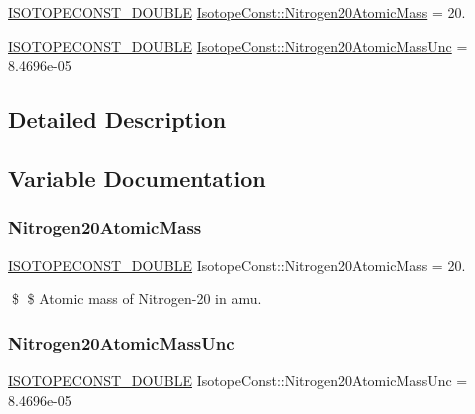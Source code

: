 \begin{DoxyCompactItemize}
\item 
\mbox{\hyperlink{group___isotope_const-_macros_ga8f45a7272ce02c0b4c65c44636ed719a}{I\+S\+O\+T\+O\+P\+E\+C\+O\+N\+S\+T\+\_\+\+D\+O\+U\+B\+LE}} \mbox{\hyperlink{group___isotope_const-_nitrogen-_n20_gadb707dbafdeed9dc6280375b0e3ff050}{Isotope\+Const\+::\+Nitrogen20\+Atomic\+Mass}} = 20.
\item 
\mbox{\hyperlink{group___isotope_const-_macros_ga8f45a7272ce02c0b4c65c44636ed719a}{I\+S\+O\+T\+O\+P\+E\+C\+O\+N\+S\+T\+\_\+\+D\+O\+U\+B\+LE}} \mbox{\hyperlink{group___isotope_const-_nitrogen-_n20_ga5f70a30733c52884808cba7f1b2c8115}{Isotope\+Const\+::\+Nitrogen20\+Atomic\+Mass\+Unc}} = 8.\+4696e-\/05
\end{DoxyCompactItemize}


\subsection{Detailed Description}


\subsection{Variable Documentation}
\mbox{\label{group___isotope_const-_nitrogen-_n20_gadb707dbafdeed9dc6280375b0e3ff050}} 
\subsubsection{\texorpdfstring{Nitrogen20\+Atomic\+Mass}{Nitrogen20AtomicMass}}
{\footnotesize\ttfamily \mbox{\hyperlink{group___isotope_const-_macros_ga8f45a7272ce02c0b4c65c44636ed719a}{I\+S\+O\+T\+O\+P\+E\+C\+O\+N\+S\+T\+\_\+\+D\+O\+U\+B\+LE}} Isotope\+Const\+::\+Nitrogen20\+Atomic\+Mass = 20.}

\$ \$ Atomic mass of Nitrogen-\/20 in amu. \mbox{\label{group___isotope_const-_nitrogen-_n20_ga5f70a30733c52884808cba7f1b2c8115}} 
\subsubsection{\texorpdfstring{Nitrogen20\+Atomic\+Mass\+Unc}{Nitrogen20AtomicMassUnc}}
{\footnotesize\ttfamily \mbox{\hyperlink{group___isotope_const-_macros_ga8f45a7272ce02c0b4c65c44636ed719a}{I\+S\+O\+T\+O\+P\+E\+C\+O\+N\+S\+T\+\_\+\+D\+O\+U\+B\+LE}} Isotope\+Const\+::\+Nitrogen20\+Atomic\+Mass\+Unc = 8.\+4696e-\/05}

